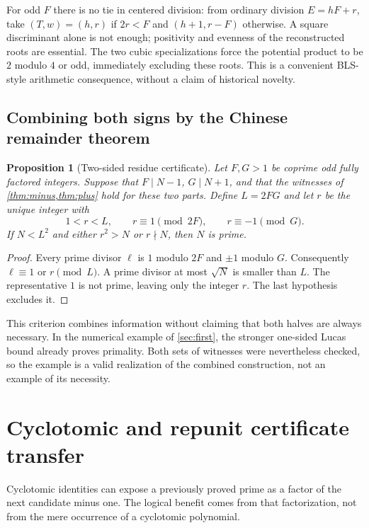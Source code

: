 \documentclass[11pt,a4paper]{article}
\newtheorem{proposition}[theorem]{Proposition}
\theoremstyle{definition}\newtheorem{definition}[theorem]{Definition}
\theoremstyle{remark}\newtheorem{remark}[theorem]{Remark}
\begin{document}
For odd $F$ there is no tie in centered division: from ordinary division
$E=hF+r$, take $(T,w)=(h,r)$ if $2r<F$ and $(h+1,r-F)$ otherwise.
A square discriminant alone is not enough; positivity and evenness of the
reconstructed roots are essential. The two cubic specializations force the
potential product to be $2$ modulo $4$ or odd, immediately excluding these
roots. This is a convenient BLS-style arithmetic consequence, without a
claim of historical novelty.

\subsection{Combining both signs by the Chinese remainder theorem}

\begin{proposition}[Two-sided residue certificate]\label{prop:crt}
Let $F,G>1$ be coprime odd fully factored integers. Suppose that
$F\mid N-1$, $G\mid N+1$, and that the witnesses of
\cref{thm:minus,thm:plus} hold for these two parts. Define $L=2FG$ and let
$r$ be the unique integer with
\[
 1<r<L,\qquad r\equiv1\pmod{2F},\qquad r\equiv-1\pmod G.
\]
If $N<L^2$ and either $r^2>N$ or $r\nmid N$, then $N$ is prime.
\end{proposition}

\begin{proof}
Every prime divisor $\ell$ is $1$ modulo $2F$ and $\pm1$ modulo $G$.
Consequently $\ell\equiv1$ or $r\pmod L$. A prime divisor at most $\sqrt N$
is smaller than $L$. The representative $1$ is not prime, leaving only the
integer $r$. The last hypothesis excludes it.
\end{proof}

This criterion combines information without claiming that both halves are
always necessary. In the numerical example of \cref{sec:first}, the stronger
one-sided Lucas bound already proves primality. Both sets of witnesses were
nevertheless checked, so the example is a valid realization of the combined
construction, not an example of its necessity.

\section{Cyclotomic and repunit certificate transfer}
\label{sec:cyclotomic}

Cyclotomic identities can expose a previously proved prime as a factor of the
next candidate minus one. The logical benefit comes from that factorization,
not from the mere occurrence of a cyclotomic polynomial.
\end{document}
